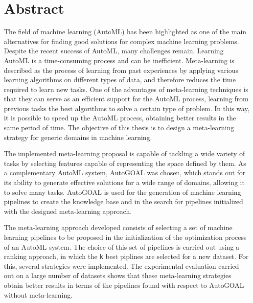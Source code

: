 \section*{Abstract}

The field of machine learning (AutoML) has been highlighted as one of the main alternatives for finding good solutions for complex machine learning problems. Despite the recent success of AutoML, many challenges remain. Learning AutoML is a time-consuming process and can be inefficient. Meta-learning is described as the process of learning from past experiences by applying various learning algorithms on different types of data, and therefore reduces the time required to learn new tasks. One of the advantages of meta-learning techniques is that they can serve as an efficient support for the AutoML process, learning from previous tasks the best algorithms to solve a certain type of problem. In this way, it is possible to speed up the AutoML process, obtaining better results in the same period of time. The objective of this thesis is to design a meta-learning strategy for generic domains in machine learning.

The implemented meta-learning proposal is capable of tackling a wide variety of tasks by selecting features capable of representing the space defined by them.
As a complementary AutoML system, AutoGOAL was chosen, which stands out for its ability to generate effective solutions for a wide range of domains, allowing it to solve many tasks. AutoGOAL is used for the generation of machine learning pipelines to create the knowledge base and in the search for pipelines initialized with the designed meta-learning approach. %

The meta-learning approach developed consists of selecting a set of machine learning pipelines to be proposed in the initialization of the optimization process of an AutoML system. The choice of this set of pipelines is carried out using a ranking approach, in which the \texttt{k} best piplines are selected for a new dataset. For this, several strategies were implemented. The experimental evaluation carried out on a large number of datasets shows that these meta-learning strategies obtain better results in terms of the pipelines found with respect to AutoGOAL without meta-learning.

